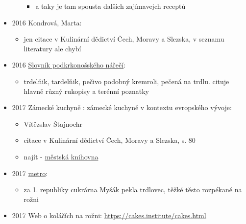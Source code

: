 \begin{itemize}
\begin{itemize}
    \begin{itemize}
    \tightlist
    \item
      a taky je tam spousta dalších zajímavejch receptů
    \end{itemize}
  \end{itemize}
\item
  2016 Kondrová, Marta:

  \begin{itemize}
  \tightlist
  \item
    jen citace v Kulinární dědictví Čech, Moravy a Slezska, v seznamu
    literatury ale chybí
  \end{itemize}
\item
  2016
  \href{https://ceskadigitalniknihovna.cz/view/uuid:cc664180-3864-11ea-85b5-005056827e52?page=uuid\%3A2786f459-7045-4ac5-8f33-a52948185820&fulltext=trdeln\%C3\%ADk\%20OR\%20trdeln\%C3\%ADky\%20OR\%20trdeln\%C3\%ADk\%C5\%AF&source=mzk}{Slovník
  podkrkonošského nářečí}:

  \begin{itemize}
  \tightlist
  \item
    trdelňik, tardelňik, pečivo podobný kremroli, pečená na trdlu.
    cituje hlavně různý rukopisy a terénní poznatky
  \end{itemize}
\item
  2017 Zámecké kuchyně : zámecké kuchyně v kontextu evropského vývoje:

  \begin{itemize}
  \tightlist
  \item
    Vítězslav Štajnochr
  \item
    citace v Kulinární dědictví Čech, Moravy a Slezska, s. 80
  \item
    najít -
    \href{https://search.mlp.cz/cz/titul/zamecke-kuchyne/4396772/\#/getPodobneTituly=deskriptory-eq:3212124-amp:key-eq:4396772}{městská
    knihovna}
  \end{itemize}
\item
  2017
  \href{https://www.metro.cz/praha/masarykovi-pekli-dort-cukrarnu-zavrelo-znarodneni.A171019_160631_metro-praha_lam}{metro}:

  \begin{itemize}
  \tightlist
  \item
    za 1. republiky cukrárna Myšák pekla trdlovec, těžké těsto rozpékané
    na rožni
  \end{itemize}
\item
  2017 Web o koláčích na rožni: \url{https://cakes.institute/cakes.html}


\end{itemize}
